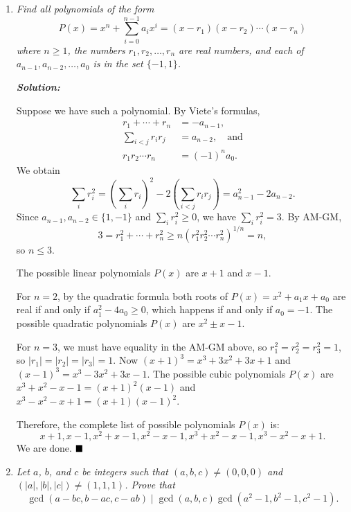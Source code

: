 \documentclass[12pt]{article}
\newcommand{\sol}{\textbf{\textit{Solution: }}}
\begin{document}
\begin{enumerate}[topsep=2\bigskipamount,itemsep=\bigskipamount]
\item \textit{Find all polynomials of the form
\[P(x) = x^{n} + \sum_{i = 0}^{n-1}a_{i}x^{i} = (x-r_1)(x-r_2)\dotsm(x-r_n) \]
where $n \geqslant 1$, the numbers $r_{1}, r_{2}, \ldots, r_{n}$ are real numbers, and each of $a_{n - 1}, a_{n - 2}, \ldots, a_{0}$ is in the set $\{-1, 1\}$.}

\sol

Suppose we have such a polynomial.
By Viete's formulas,
\begin{align*}
    r_{1} + \cdots + r_{n} &= -a_{n - 1},\\
    \sum_{i < j} r_{i}r_{j} &= a_{n - 2}, \quad\text{and}\\
    r_{1}r_{2}\cdots{}r_{n} &= (-1)^{n}a_{0}.
\end{align*}
We obtain
\[\sum_{i}r_{i}^{2} = \left(\sum_{i}r_{i}\right)^{2} - 2\left(\sum_{i < j} r_{i}r_{j}\right) = a_{n - 1}^{2} - 2a_{n - 2}.\]
Since \(a_{n - 1}, a_{n - 2} \in \{1, -1\}\) and \(\sum_{i}r_{i}^{2} \geqslant 0\), we have \(\sum_{i}r_{i}^{2} = 3\).
By AM-GM,
\[3 = r_{1}^{2} + \cdots + r_{n}^{2} \geqslant n(r_{1}^{2}r_{2}^{2}\dotsm r_{n}^{2})^{1/n} = n,\]
so \(n \leqslant 3\).

The possible linear polynomials \(P(x)\) are \(x + 1\) and \(x - 1\).

For \(n = 2\), by the quadratic formula both roots of \(P(x) = x^{2} + a_{1}x + a_{0}\) are real if and only if \(a_{1}^{2} - 4a_{0} \geqslant 0\), which happens if and only if \(a_{0} = -1\).
The possible quadratic polynomials \(P(x)\) are \(x^{2} \pm x - 1\).

For \(n = 3\), we must have equality in the AM-GM above, so \(r_{1}^{2} = r_{2}^{2} = r_{3}^{2} = 1\), so \(|r_{1}| = |r_{2}| = |r_{3}| = 1\). Now \((x + 1)^{3} = x^{3} + 3x^{2} + 3x + 1\) and \((x - 1)^{3} = x^{3} - 3x^{2} + 3x - 1\).
The possible cubic polynomials \(P(x)\) are \(x^{3} + x^{2} - x - 1 = (x + 1)^{2}(x - 1)\) and \(x^{3} - x^{2} - x + 1 = (x + 1)(x - 1)^{2}\).

Therefore, the complete list of possible polynomials \(P(x)\) is:
\[x + 1, x - 1, x^{2} + x - 1, x^{2} - x - 1, x^{3} + x^{2} - x - 1, x^{3} - x^{2} - x + 1.\]
We are done. $\hfill\blacksquare$

\item \textit{Let \(a\), \(b\), and \(c\) be integers such that \((a, b, c) \neq (0, 0, 0)\) and \((|a|, |b|, |c|) \neq (1, 1, 1)\).
Prove that
\[\gcd(a - bc, b - ac, c - ab) \mid \gcd(a, b, c)\gcd(a^{2} - 1, b^{2} - 1, c^{2} - 1).\]}


\end{enumerate}
\end{document}
